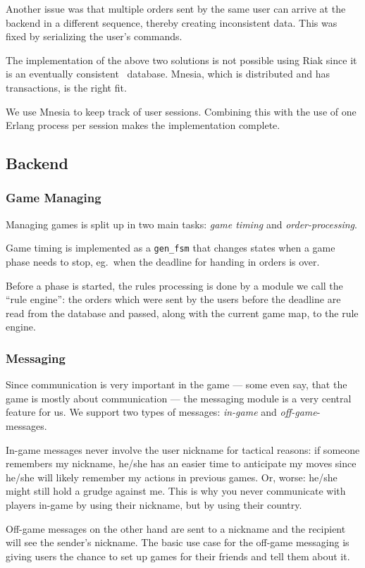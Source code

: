 \documentclass[11pt,a4paper]{report}
\begin{document}
Another issue was that multiple orders sent by the same user can arrive at the
backend in a different sequence, thereby creating inconsistent data. This was
fixed by serializing the user's commands.

The implementation of the above two solutions is not possible using Riak since
it is an eventually consistent~\cite{eventual_consistency} database.
Mnesia, which is distributed and has transactions, is the right fit.

We use Mnesia to keep track of user sessions. Combining this with
the use of one Erlang process per session makes the implementation complete.


\subsection{Backend}
\subsubsection{Game Managing}
Managing games is split up in two main tasks: {\em game timing\/} and
{\em order-processing}.

Game timing is implemented as a {\tt gen\_fsm} that changes states when a game
phase needs to stop, eg.\ when the deadline for handing in orders is over.

Before a phase is started, the rules processing is done by a module we call
the ``rule engine'': the orders which were sent by the users before the
deadline are read from the database and passed, along with the current game
map, to the rule engine.
\subsubsection{Messaging}
Since communication is very important in the game --- some even say, that the
game is mostly about communication --- the messaging module is a very central
feature for us. We support two types of messages: {\em in-game\/} and
{\em off-game\/}-messages.

In-game messages never involve the user nickname for tactical reasons: if someone
remembers my nickname, he/she has an easier time to anticipate my moves since he/she
will likely remember my actions in previous games.
Or, worse: he/she might still hold a grudge against me. This is why you never
communicate with players in-game by using their nickname, but by using their
country.

Off-game messages on the other hand are sent to a nickname and the recipient
will see the sender's nickname. The basic use case for the off-game messaging
is giving users the chance to set up games for their friends and tell them
about it.
\end{document}
